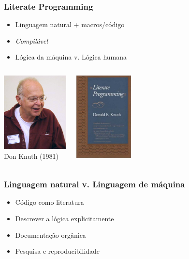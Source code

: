 \documentclass{beamer}
\begin{document}
\begin{frame}
  \frametitle{Literate Programming}
  \begin{itemize}
  \item Linguagem natural + macros/código
  \item \emph{Compilável}
  \item Lógica da máquina v. Lógica humana
  \end{itemize}
  \begin{columns}
    \column{5cm}
    \begin{center}
      \includegraphics[width=3.4cm]{figs/knuth.jpg}\\
      Don Knuth (1981)
    \end{center}
    \column{5cm}
    \begin{center}
      \includegraphics[width=3cm]{figs/Literate_Programming_book_cover.jpg}
    \end{center}
  \end{columns}
\end{frame}

\begin{frame}
  \frametitle{Linguagem natural v. Linguagem de máquina}
  \begin{itemize}
  \item Código como literatura
  \item Descrever a lógica explicitamente
  \item Documentação orgânica
  \item \alert{Pesquisa e reproducibilidade}
  \end{itemize}
\end{frame}
\end{document}
